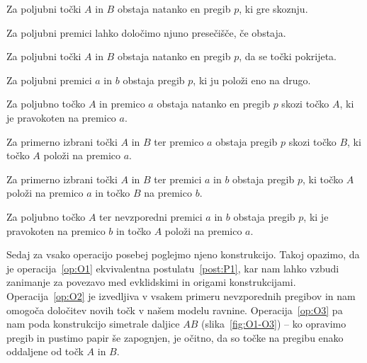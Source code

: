 \begin{operacija}
    \label{op:O1}
    Za poljubni točki $A$ in $B$ obstaja natanko en pregib $p$, ki gre skoznju.
\end{operacija}
\begin{operacija}
    \label{op:O2}
    Za poljubni premici lahko določimo njuno presečišče, če obstaja.
\end{operacija}
\begin{operacija}
    \label{op:O3}
    Za poljubni točki $A$ in $B$ obstaja natanko en pregib $p$, da se točki pokrijeta.
\end{operacija}
\begin{operacija}
    \label{op:O4}
    Za poljubni premici $a$ in $b$ obstaja pregib $p$, ki ju položi eno na drugo.
\end{operacija}
\begin{operacija}
    \label{op:O5}
    Za poljubno točko $A$ in premico $a$ obstaja natanko en pregib $p$ skozi točko $A$, ki je pravokoten na premico $a$.
\end{operacija}
\begin{operacija}
    \label{op:O6}
    Za primerno izbrani točki $A$ in $B$ ter premico $a$ obstaja pregib $p$ skozi točko $B$, ki točko $A$ položi na premico $a$.
\end{operacija}
\begin{operacija}
    \label{op:O7}
    Za primerno izbrani točki $A$ in $B$ ter premici $a$ in $b$ obstaja pregib $p$, ki točko $A$ položi na premico $a$ in točko $B$ na premico $b$.
\end{operacija}
\begin{operacija}
    \label{op:O8}
    Za poljubno točko $A$ ter nevzporedni premici $a$ in $b$ obstaja pregib $p$, ki je pravokoten na premico $b$ in točko $A$ položi na premico $a$.
\end{operacija}

Sedaj za vsako operacijo posebej poglejmo njeno konstrukcijo. Takoj opazimo, da je operacija~\ref{op:O1} ekvivalentna postulatu~\ref{post:P1}, kar nam lahko vzbudi zanimanje za povezavo med evklidskimi in origami konstrukcijami. Operacija~\ref{op:O2} je izvedljiva v vsakem primeru nevzporednih pregibov in nam omogoča določitev novih točk v našem modelu ravnine. Operacija~\ref{op:O3} pa nam poda konstrukcijo simetrale daljice $AB$ (slika~\ref{fig:O1-O3}) -- ko opravimo pregib in pustimo papir še zapognjen, je očitno, da so točke na pregibu enako oddaljene od točk $A$ in $B$.

